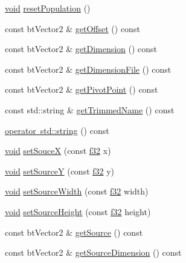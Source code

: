 \begin{DoxyCompactItemize}
\mbox{\hyperlink{_thread_8h_af1e856da2e658414cb2456cb6f7ebc66}{void}} \mbox{\hyperlink{classnjli_1_1_rect_a56aa65f48127935bc155f447ff6fa6f1}{reset\+Population}} ()
\item 
const bt\+Vector2 \& \mbox{\hyperlink{classnjli_1_1_rect_a701e4a44071b449ded9dbcde1412e271}{get\+Offset}} () const
\item 
const bt\+Vector2 \& \mbox{\hyperlink{classnjli_1_1_rect_ab814faffd8863d13821d08e5478d98ea}{get\+Dimension}} () const
\item 
const bt\+Vector2 \& \mbox{\hyperlink{classnjli_1_1_rect_a7a3792fecac4ecc852378c5503fecbc6}{get\+Dimension\+File}} () const
\item 
const bt\+Vector2 \& \mbox{\hyperlink{classnjli_1_1_rect_a6d7b7208975391879326a1d0c957a30b}{get\+Pivot\+Point}} () const
\item 
const std\+::string \& \mbox{\hyperlink{classnjli_1_1_rect_a75997b34f04a294b72534d0c267ceb30}{get\+Trimmed\+Name}} () const
\item 
\mbox{\hyperlink{classnjli_1_1_rect_ac0c7f6ed39d0448a6cd0e5c906a5596c}{operator std\+::string}} () const
\item 
\mbox{\hyperlink{_thread_8h_af1e856da2e658414cb2456cb6f7ebc66}{void}} \mbox{\hyperlink{classnjli_1_1_rect_af5b5c10f47874e5b82c55d81a094a881}{set\+SouceX}} (const \mbox{\hyperlink{_util_8h_a5f6906312a689f27d70e9d086649d3fd}{f32}} x)
\item 
\mbox{\hyperlink{_thread_8h_af1e856da2e658414cb2456cb6f7ebc66}{void}} \mbox{\hyperlink{classnjli_1_1_rect_aad437bb2add0ea5cb17f32a51877e70e}{set\+SourceY}} (const \mbox{\hyperlink{_util_8h_a5f6906312a689f27d70e9d086649d3fd}{f32}} y)
\item 
\mbox{\hyperlink{_thread_8h_af1e856da2e658414cb2456cb6f7ebc66}{void}} \mbox{\hyperlink{classnjli_1_1_rect_aa3fd64395ce6b785b3ba5b38d11e1ee8}{set\+Source\+Width}} (const \mbox{\hyperlink{_util_8h_a5f6906312a689f27d70e9d086649d3fd}{f32}} width)
\item 
\mbox{\hyperlink{_thread_8h_af1e856da2e658414cb2456cb6f7ebc66}{void}} \mbox{\hyperlink{classnjli_1_1_rect_ac47ba4c289d8439dafd653e3c403131a}{set\+Source\+Height}} (const \mbox{\hyperlink{_util_8h_a5f6906312a689f27d70e9d086649d3fd}{f32}} height)
\item 
const bt\+Vector2 \& \mbox{\hyperlink{classnjli_1_1_rect_aa68763bfa980409c25d162f10281cc12}{get\+Source}} () const
\item 
const bt\+Vector2 \& \mbox{\hyperlink{classnjli_1_1_rect_abdc3ffdb2db699465f774dba88dced61}{get\+Source\+Dimension}} () const
\end{DoxyCompactItemize}

